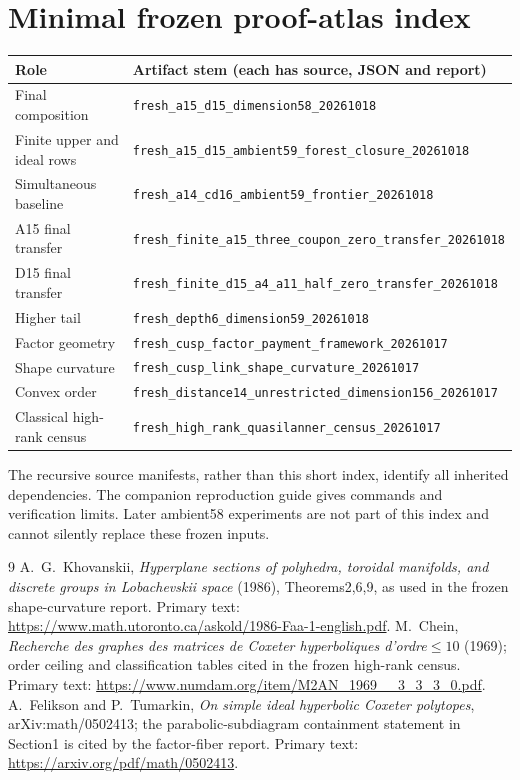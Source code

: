 \documentclass[11pt]{article}
\theoremstyle{remark}\newtheorem{remark}[theorem]{Remark}
\newcommand{\cert}[1]{\nolinkurl{#1}}
\begin{document}
\section{Minimal frozen proof-atlas index}
\small
\begin{longtable}{p{}p{}}
\toprule
Role&Artifact stem (each has source, JSON and report)\\\midrule
Final composition&\cert{fresh_a15_d15_dimension58_20261018}\\
Finite upper and ideal rows&\cert{fresh_a15_d15_ambient59_forest_closure_20261018}\\
Simultaneous baseline&\cert{fresh_a14_cd16_ambient59_frontier_20261018}\\
A15 final transfer&\cert{fresh_finite_a15_three_coupon_zero_transfer_20261018}\\
D15 final transfer&\cert{fresh_finite_d15_a4_a11_half_zero_transfer_20261018}\\
Higher tail&\cert{fresh_depth6_dimension59_20261018}\\
Factor geometry&\cert{fresh_cusp_factor_payment_framework_20261017}\\
Shape curvature&\cert{fresh_cusp_link_shape_curvature_20261017}\\
Convex order&\cert{fresh_distance14_unrestricted_dimension156_20261017}\\
Classical high-rank census&\cert{fresh_high_rank_quasilanner_census_20261017}\\\bottomrule
\end{longtable}
\normalsize
The recursive source manifests, rather than this short index, identify
all inherited dependencies. The companion reproduction guide gives
commands and verification limits. Later ambient58 experiments are not
part of this index and cannot silently replace these frozen inputs.

\begin{thebibliography}{9}
A.~G.~Khovanskii, \emph{Hyperplane sections of polyhedra, toroidal
manifolds, and discrete groups in Lobachevskii space} (1986),
Theorems2,6,9, as used in the frozen shape-curvature report.
Primary text: \url{https://www.math.utoronto.ca/askold/1986-Faa-1-english.pdf}.
M.~Chein, \emph{Recherche des graphes des matrices de Coxeter
hyperboliques d'ordre$\leq10$} (1969); order ceiling and classification
tables cited in the frozen high-rank census.
Primary text: \url{https://www.numdam.org/item/M2AN_1969__3_3_3_0.pdf}.
A.~Felikson and P.~Tumarkin, \emph{On simple ideal hyperbolic Coxeter
polytopes}, arXiv:math/0502413; the parabolic-subdiagram containment
statement in Section1 is cited by the factor-fiber report.
Primary text: \url{https://arxiv.org/pdf/math/0502413}.
\end{thebibliography}
\end{document}
